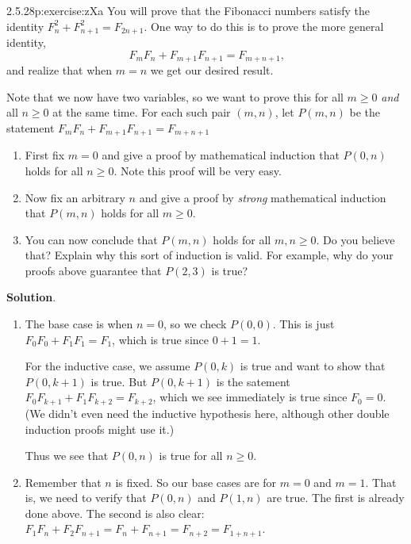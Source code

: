 \documentclass[twoside,11pt,]{book}
\newcommand{\blocktitlefont}{\relax}
\numberwithin{equation}{chapter}
\begin{document}
\begin{divisionsolution}{2.5.28}{}{p:exercise:zXa}%
You will prove that the Fibonacci numbers satisfy the identity \(F_n^2 + F_{n+1}^2 = F_{2n+1}\). One way to do this is to prove the more general identity,%
\begin{equation*}
F_mF_n + F_{m+1}F_{n+1} = F_{m+n+1}\text{,}
\end{equation*}
and realize that when \(m = n\) we get our desired result.%
\par
Note that we now have two variables, so we want to prove this for all \(m \ge 0\) \emph{and} all \(n \ge 0\) at the same time. For each such pair \((m,n)\), let \(P(m,n)\) be the statement \(F_mF_n + F_{m+1}F_{n+1} = F_{m+n+1}\)%
\begin{enumerate}[label=(\alph*)]
\item{}First fix \(m = 0\) and give a proof by mathematical induction that \(P(0,n)\) holds for all \(n \ge 0\). Note this proof will be very easy.%
\item{}Now fix an arbitrary \(n\) and give a proof by \emph{strong} mathematical induction that \(P(m,n)\) holds for all \(m \ge 0\).%
\item{}You can now conclude that \(P(m,n)\) holds for all \(m,n\ge 0\). Do you believe that? Explain why this sort of induction is valid. For example, why do your proofs above guarantee that \(P(2,3)\) is true?%
\end{enumerate}
%
\par\smallskip%
\noindent\textbf{\blocktitlefont Solution}.\quad{}%
\begin{enumerate}[label=(\alph*)]
\item{}The base case is when \(n = 0\), so we check \(P(0,0)\). This is just \(F_0F_0 + F_1F_1 = F_1\), which is true since \(0+1 = 1\).%
\par
For the inductive case, we assume \(P(0,k)\) is true and want to show that \(P(0,k+1)\) is true. But \(P(0,k+1)\) is the satement \(F_0F_{k+1} + F_{1}F_{k+2} = F_{k+2}\), which we see immediately is true since \(F_0 = 0\). (We didn't even need the inductive hypothesis here, although other double induction proofs might use it.)%
\par
Thus we see that \(P(0,n)\) is true for all \(n \ge 0\).%
\item{}Remember that \(n\) is fixed. So our base cases are for \(m = 0\) and \(m = 1\). That is, we need to verify that \(P(0,n)\) and \(P(1,n)\) are true. The first is already done above. The second is also clear: \(F_1F_n + F_2F_{n+1} = F_n + F_{n+1} = F_{n+2} = F_{1 + n + 1}\).%

\end{enumerate}
\end{divisionsolution}
\end{document}
